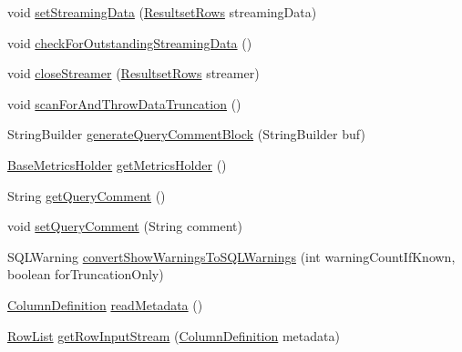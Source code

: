 \begin{DoxyCompactItemize}
\item 
void \mbox{\hyperlink{classcom_1_1mysql_1_1cj_1_1protocol_1_1a_1_1_native_protocol_a87520f44555b059929ed6941623fa5a6}{set\+Streaming\+Data}} (\mbox{\hyperlink{interfacecom_1_1mysql_1_1cj_1_1protocol_1_1_resultset_rows}{Resultset\+Rows}} streaming\+Data)
\item 
void \mbox{\hyperlink{classcom_1_1mysql_1_1cj_1_1protocol_1_1a_1_1_native_protocol_af42af8add08e816b8053659d44a2e127}{check\+For\+Outstanding\+Streaming\+Data}} ()
\item 
void \mbox{\hyperlink{classcom_1_1mysql_1_1cj_1_1protocol_1_1a_1_1_native_protocol_a11aa5581264828320440e37d871816df}{close\+Streamer}} (\mbox{\hyperlink{interfacecom_1_1mysql_1_1cj_1_1protocol_1_1_resultset_rows}{Resultset\+Rows}} streamer)
\item 
void \mbox{\hyperlink{classcom_1_1mysql_1_1cj_1_1protocol_1_1a_1_1_native_protocol_a8686c3fec87ed4d03775de6cf138689e}{scan\+For\+And\+Throw\+Data\+Truncation}} ()
\item 
String\+Builder \mbox{\hyperlink{classcom_1_1mysql_1_1cj_1_1protocol_1_1a_1_1_native_protocol_afae13c03a8e5589e8cf316f7f797b159}{generate\+Query\+Comment\+Block}} (String\+Builder buf)
\item 
\mbox{\hyperlink{classcom_1_1mysql_1_1cj_1_1log_1_1_base_metrics_holder}{Base\+Metrics\+Holder}} \mbox{\hyperlink{classcom_1_1mysql_1_1cj_1_1protocol_1_1a_1_1_native_protocol_a3f99cc50263379785978172b329dde39}{get\+Metrics\+Holder}} ()
\item 
String \mbox{\hyperlink{classcom_1_1mysql_1_1cj_1_1protocol_1_1a_1_1_native_protocol_a49cbec750255abc9a23f447effd70d1d}{get\+Query\+Comment}} ()
\item 
void \mbox{\hyperlink{classcom_1_1mysql_1_1cj_1_1protocol_1_1a_1_1_native_protocol_a31d74c4c65825a8c0b875831e4884f58}{set\+Query\+Comment}} (String comment)
\item 
S\+Q\+L\+Warning \mbox{\hyperlink{classcom_1_1mysql_1_1cj_1_1protocol_1_1a_1_1_native_protocol_ad6b7d57ce7e74e78055ed399bf79dc3b}{convert\+Show\+Warnings\+To\+S\+Q\+L\+Warnings}} (int warning\+Count\+If\+Known, boolean for\+Truncation\+Only)
\item 
\mbox{\hyperlink{interfacecom_1_1mysql_1_1cj_1_1protocol_1_1_column_definition}{Column\+Definition}} \mbox{\hyperlink{classcom_1_1mysql_1_1cj_1_1protocol_1_1a_1_1_native_protocol_ade969eccfe66d5a42008c60897d118d7}{read\+Metadata}} ()
\item 
\mbox{\hyperlink{interfacecom_1_1mysql_1_1cj_1_1result_1_1_row_list}{Row\+List}} \mbox{\hyperlink{classcom_1_1mysql_1_1cj_1_1protocol_1_1a_1_1_native_protocol_a6bb695c2fd2b3492490208c56b23ebd4}{get\+Row\+Input\+Stream}} (\mbox{\hyperlink{interfacecom_1_1mysql_1_1cj_1_1protocol_1_1_column_definition}{Column\+Definition}} metadata)

\end{DoxyCompactItemize}
